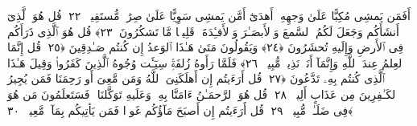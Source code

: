  أَفَمَن يَمشِى مُكِبًّا عَلَىٰ وَجهِهِۦٓ أَهدَىٰٓ أَمَّن يَمشِى سَوِيًّا عَلَىٰ صِرَٰطٍۢ مُّستَقِيمٍۢ ﴿٢٢﴾
 قُل هُوَ ٱلَّذِىٓ أَنشَأَكُم وَجَعَلَ لَكُمُ ٱلسَّمعَ وَٱلأَبصَـٰرَ وَٱلأَفـِٔدَةَ ۖ قَلِيلًۭا مَّا تَشكُرُونَ ﴿٢٣﴾
 قُل هُوَ ٱلَّذِى ذَرَأَكُم فِى ٱلأَرضِ وَإِلَيهِ تُحشَرُونَ ﴿٢٤﴾
 وَيَقُولُونَ مَتَىٰ هَـٰذَا ٱلوَعدُ إِن كُنتُم صَـٰدِقِينَ ﴿٢٥﴾
 قُل إِنَّمَا ٱلعِلمُ عِندَ ٱللَّهِ وَإِنَّمَآ أَنَا۠ نَذِيرٌۭ مُّبِينٌۭ ﴿٢٦﴾
 فَلَمَّا رَأَوهُ زُلفَةًۭ سِيٓـَٔت وُجُوهُ ٱلَّذِينَ كَفَرُوا۟ وَقِيلَ هَـٰذَا ٱلَّذِى كُنتُم بِهِۦ تَدَّعُونَ ﴿٢٧﴾
 قُل أَرَءَيتُم إِن أَهلَكَنِىَ ٱللَّهُ وَمَن مَّعِىَ أَو رَحِمَنَا فَمَن يُجِيرُ ٱلكَـٰفِرِينَ مِن عَذَابٍ أَلِيمٍۢ ﴿٢٨﴾
 قُل هُوَ ٱلرَّحمَـٰنُ ءَامَنَّا بِهِۦ وَعَلَيهِ تَوَكَّلنَا ۖ فَسَتَعلَمُونَ مَن هُوَ فِى ضَلَـٰلٍۢ مُّبِينٍۢ ﴿٢٩﴾
 قُل أَرَءَيتُم إِن أَصبَحَ مَآؤُكُم غَورًۭا فَمَن يَأتِيكُم بِمَآءٍۢ مَّعِينٍۭ ﴿٣٠﴾
 
